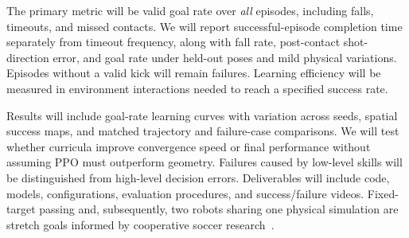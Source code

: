 \documentclass[10pt,twocolumn,letterpaper]{article}
\begin{document}
The primary metric will be valid goal rate over \emph{all} episodes, including falls, timeouts, and missed contacts. We will report successful-episode completion time separately from timeout frequency, along with fall rate, post-contact shot-direction error, and goal rate under held-out poses and mild physical variations. Episodes without a valid kick will remain failures. Learning efficiency will be measured in environment interactions needed to reach a specified success rate.

Results will include goal-rate learning curves with variation across seeds, spatial success maps, and matched trajectory and failure-case comparisons. We will test whether curricula improve convergence speed or final performance without assuming PPO must outperform geometry. Failures caused by low-level skills will be distinguished from high-level decision errors. Deliverables will include code, models, configurations, evaluation procedures, and success/failure videos. Fixed-target passing and, subsequently, two robots sharing one physical simulation are stretch goals informed by cooperative soccer research~\cite{marladona}.
\end{document}
